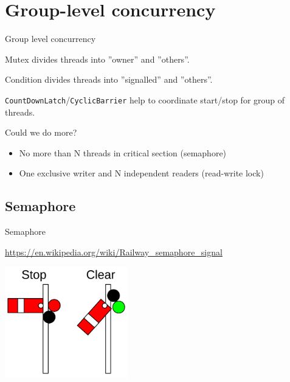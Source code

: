 
\section{Group-level concurrency}
\showTOC

\begin{frame}{Group level concurrency}

Mutex divides threads into ''owner'' and ''others''.

Condition divides threads into ''signalled'' and ''others''.

\texttt{CountDownLatch}/\texttt{CyclicBarrier} help to coordinate start/stop for group of threads.

Could we do more?

\begin{itemize}
    \pause
    \item No more than N threads in critical section \pause (semaphore)
    \pause
    \item One exclusive writer and N independent readers \pause (read-write lock)
\end{itemize}

\end{frame}


\subsection{Semaphore}
\showTOCSub

\begin{frame}[fragile]{Semaphore}

\url{https://en.wikipedia.org/wiki/Railway_semaphore_signal}

\begin{center}
\includegraphics[width=0.4\textwidth]{./pics/sema.png}
\end{center}

\end{frame}


